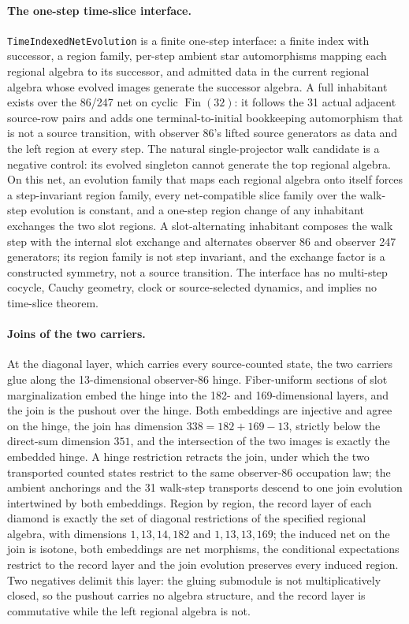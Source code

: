 \documentclass[11pt]{article}
\theoremstyle{remark}
\theoremstyle{plain}
\begin{document}
\paragraph{The one-step time-slice interface.}
\texttt{TimeIndexedNetEvolution} is a finite one-step interface: a finite
index with successor, a region family, per-step ambient star automorphisms
mapping each regional algebra to its successor, and admitted data in the
current regional algebra whose evolved images generate the successor
algebra. A full inhabitant exists over the 86/247 net on cyclic
\(\operatorname{Fin}(32)\): it follows the 31 actual adjacent source-row
pairs and adds one terminal-to-initial bookkeeping automorphism that is not
a source transition, with observer 86's lifted source generators as data
and the left region at every step. The natural single-projector walk
candidate is a negative control: its evolved singleton cannot generate the
top regional algebra. On this net, an evolution family that maps each
regional algebra onto itself forces a step-invariant region family, every
net-compatible slice family over the walk-step evolution is constant, and
a one-step region change of any inhabitant exchanges the two slot regions.
A slot-alternating inhabitant composes the walk step with the internal slot
exchange and alternates observer 86 and observer 247 generators; its region
family is not step invariant, and the exchange factor is a constructed
symmetry, not a source transition. The interface has no multi-step cocycle,
Cauchy geometry, clock or source-selected dynamics, and implies no
time-slice theorem.

\paragraph{Joins of the two carriers.}
At the diagonal layer, which carries every source-counted state, the two
carriers glue along the 13-dimensional observer-86 hinge. Fiber-uniform
sections of slot marginalization embed the hinge into the 182- and
169-dimensional layers, and the join is the pushout over the hinge. Both
embeddings are injective and agree on the hinge, the join has dimension
\(338=182+169-13\), strictly below the direct-sum dimension \(351\), and the
intersection of the two images is exactly the embedded hinge. A hinge
restriction retracts the join, under which the two transported counted
states restrict to the same observer-86 occupation law; the ambient
anchorings and the 31 walk-step transports descend to one join evolution
intertwined by both embeddings. Region by region, the record layer of each
diamond is exactly the set of diagonal restrictions of the specified
regional algebra, with dimensions \(1,13,14,182\) and \(1,13,13,169\); the
induced net on the join is isotone, both embeddings are net morphisms, the
conditional expectations restrict to the record layer and the join
evolution preserves every induced region. Two negatives delimit this layer:
the gluing submodule is not multiplicatively closed, so the pushout carries
no algebra structure, and the record layer is commutative while the left
regional algebra is not.
\end{document}
